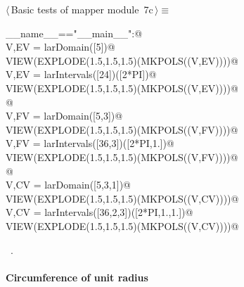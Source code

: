 \documentclass[11pt,oneside]{article}	%
\begin{document}
	
\begin{flushleft} \small \label{scrap17}
\protect{}$\langle\,$Basic tests of mapper module\nobreak\ {\footnotesize 7c}$\,\rangle\equiv$
\vspace{-1ex}
\begin{list}{}{} \item
\mbox{}\verb@if __name__=="__main__":@\\
\mbox{}\verb@   V,EV = larDomain([5])@\\
\mbox{}\verb@   VIEW(EXPLODE(1.5,1.5,1.5)(MKPOLS((V,EV))))@\\
\mbox{}\verb@   V,EV = larIntervals([24])([2*PI])@\\
\mbox{}\verb@   VIEW(EXPLODE(1.5,1.5,1.5)(MKPOLS((V,EV))))@\\
\mbox{}\verb@      @\\
\mbox{}\verb@   V,FV = larDomain([5,3])@\\
\mbox{}\verb@   VIEW(EXPLODE(1.5,1.5,1.5)(MKPOLS((V,FV))))@\\
\mbox{}\verb@   V,FV = larIntervals([36,3])([2*PI,1.])@\\
\mbox{}\verb@   VIEW(EXPLODE(1.5,1.5,1.5)(MKPOLS((V,FV))))@\\
\mbox{}\verb@      @\\
\mbox{}\verb@   V,CV = larDomain([5,3,1])@\\
\mbox{}\verb@   VIEW(EXPLODE(1.5,1.5,1.5)(MKPOLS((V,CV))))@\\
\mbox{}\verb@   V,CV = larIntervals([36,2,3])([2*PI,1.,1.])@\\
\mbox{}\verb@   VIEW(EXPLODE(1.5,1.5,1.5)(MKPOLS((V,CV))))@\\
\mbox{}\verb@@{\NWsep}
\end{list}
\vspace{-1ex}
\footnotesize\addtolength{\baselineskip}{-1ex}
\begin{list}{}{\setlength{\itemsep}{-\parsep}\setlength{\itemindent}{-\leftmargin}}
\item \NWtxtMacroRefIn\ .
\end{list}
\end{flushleft}

\paragraph{Circumference of unit radius}
\end{document}
